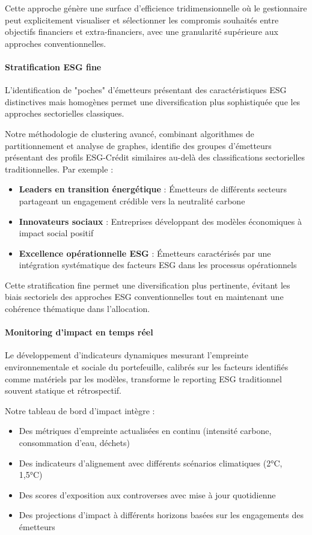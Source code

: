 Cette approche génère une surface d'efficience tridimensionnelle où le gestionnaire peut explicitement visualiser et sélectionner les compromis souhaités entre objectifs financiers et extra-financiers, avec une granularité supérieure aux approches conventionnelles.

\paragraph{Stratification ESG fine}

L'identification de "poches" d'émetteurs présentant des caractéristiques ESG distinctives mais homogènes permet une diversification plus sophistiquée que les approches sectorielles classiques.

Notre méthodologie de clustering avancé, combinant algorithmes de partitionnement et analyse de graphes, identifie des groupes d'émetteurs présentant des profils ESG-Crédit similaires au-delà des classifications sectorielles traditionnelles. Par exemple :
\begin{itemize}
    \item \textbf{Leaders en transition énergétique} : Émetteurs de différents secteurs partageant un engagement crédible vers la neutralité carbone
    \item \textbf{Innovateurs sociaux} : Entreprises développant des modèles économiques à impact social positif
    \item \textbf{Excellence opérationnelle ESG} : Émetteurs caractérisés par une intégration systématique des facteurs ESG dans les processus opérationnels
\end{itemize}

Cette stratification fine permet une diversification plus pertinente, évitant les biais sectoriels des approches ESG conventionnelles tout en maintenant une cohérence thématique dans l'allocation.

\paragraph{Monitoring d'impact en temps réel}

Le développement d'indicateurs dynamiques mesurant l'empreinte environnementale et sociale du portefeuille, calibrés sur les facteurs identifiés comme matériels par les modèles, transforme le reporting ESG traditionnel souvent statique et rétrospectif.

Notre tableau de bord d'impact intègre :
\begin{itemize}
    \item Des métriques d'empreinte actualisées en continu (intensité carbone, consommation d'eau, déchets)
    \item Des indicateurs d'alignement avec différents scénarios climatiques (2°C, 1,5°C)
    \item Des scores d'exposition aux controverses avec mise à jour quotidienne
    \item Des projections d'impact à différents horizons basées sur les engagements des émetteurs
\end{itemize}

